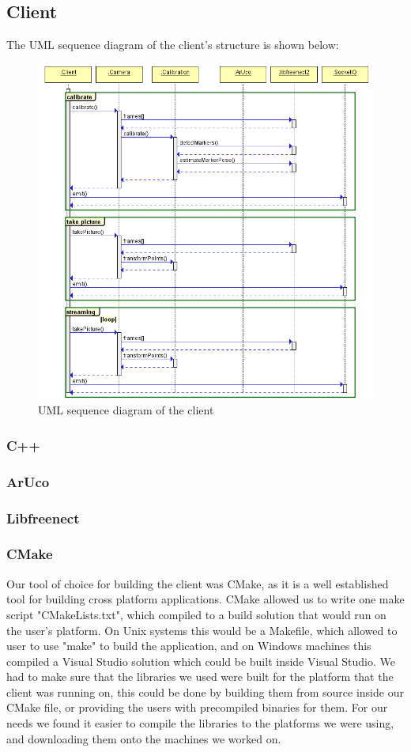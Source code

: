 \documentclass{article}
\begin{document}
\subsection{Client}
The UML sequence diagram of the client's structure is shown below:
\begin{figure}[h]
  \centering
  \includegraphics[scale=0.6]{clientUML}
  \caption{UML sequence diagram of the client}
\end{figure}
\subsubsection{C++}
\subsubsection{ArUco}
\subsubsection{Libfreenect}
\subsubsection{CMake}
Our tool of choice for building the client was CMake, as it is a well established tool for building cross platform applications. CMake allowed us to write one make script "CMakeLists.txt", which compiled to a build solution that would run on the user's platform. On Unix systems this would be a Makefile, which allowed to user to use "make" to build the application, and on Windows machines this compiled a Visual Studio solution which could be built inside Visual Studio. We had to make sure that the libraries we used were built for the platform that the client was running on, this could be done by building them from source inside our CMake file, or providing the users with precompiled binaries for them. For our needs we found it easier to compile the libraries to the platforms we were using, and downloading them onto the machines we worked on. 
\end{document}
